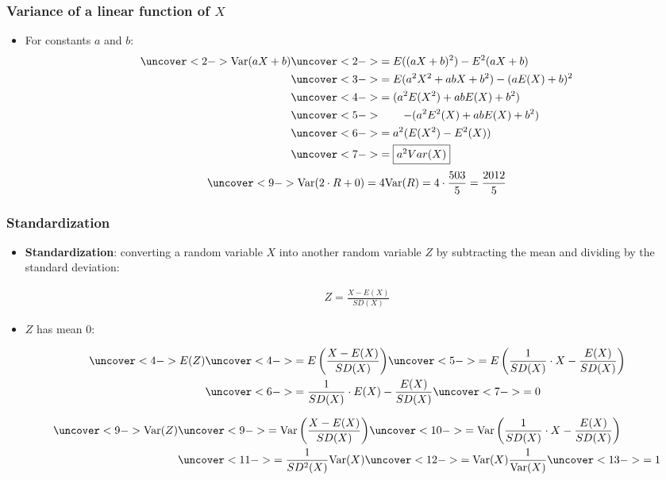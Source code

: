 \documentclass[handout]{beamer}\usepackage{graphicx, color}
\numberwithin{equation}{section}
\begin{document}
\begin{frame}
\frametitle{Variance of a linear function of $X$} \small
\begin{itemize}
\item For constants $a$ and $b$:
\begin{align*}
\uncover<2->{\text{Var}(aX + b)} & \uncover<2->{= E((aX + b)^2) - E^2(aX + b)} \\
&\uncover<3->{= E(a^2 X^2 + ab X + b^2) - (a E(X) + b)^2} \\
&\uncover<4->{= ( a^2 E(X^2) + ab E(X) + b^2)} \\
&\uncover<5->{ \qquad- (a^2 E^2(X) +  ab E(X) + b^2)} \\
&\uncover<6->{= a^2 (E(X^2) - E^2(X))} \\
&\uncover<7->{= \fbox{$a^2 Var(X)$}}
\end{align*}
\begin{align*}
\uncover<9->{\text{Var}(2 \cdot R + 0) = 4 \text{Var}(R) = 4 \cdot \frac{503}{5} = \frac{2012}{5}}
\end{align*}
\end{itemize}
\end{frame}


\begin{frame}
\frametitle{Standardization} \scriptsize
\begin{itemize}
\item {\bf Standardization}: converting a random variable $X$ into another random variable $Z$ by subtracting the mean and dividing by the standard deviation:

\pause \begin{align*}
Z = \frac{X - E(X)}{SD(X)}
\end{align*}
\pause \item $Z$ has mean 0:

\begin{align*}
\uncover<4->{E(Z)} & \uncover<4->{= E \left (\frac{X - E(X)}{SD(X)} \right)} \uncover<5->{ = E \left (\frac{1}{SD(X)} \cdot X - \frac{E(X)}{SD(X)} \right )} \\
&\uncover<6->{= \frac{1}{SD(X)} \cdot E(X) - \frac{E(X)}{SD(X)}} \uncover<7->{ = 0} \\
\end{align*}

\begin{align*}
\uncover<9->{\text{Var}(Z)} & \uncover<9->{= \text{Var} \left (\frac{X - E(X)}{SD(X)} \right)} \uncover<10->{ = \text{Var} \left (\frac{1}{SD(X)} \cdot X - \frac{E(X)}{SD(X)} \right)} \\
&\uncover<11->{= \frac{1}{SD^2(X)} \text{Var}(X)}  \uncover<12->{= \text{Var}(X) \frac{1}{\text{Var}(X)}} \uncover<13->{ = 1} \\
\end{align*}

\end{itemize}

\end{frame}
\end{document}

